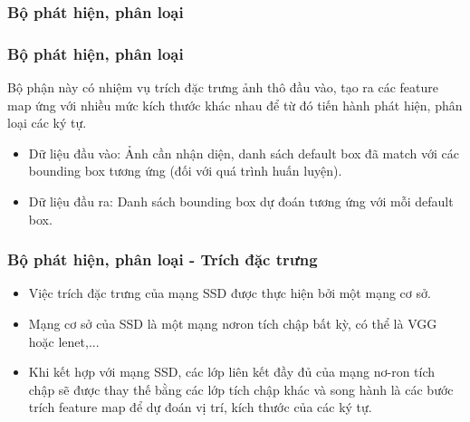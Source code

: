 \documentclass{beamer}
\begin{document}
	\subsubsection{Bộ phát hiện, phân loại}
	\begin{frame}
		\frametitle{Bộ phát hiện, phân loại}
		Bộ phận này có nhiệm vụ trích đặc trưng ảnh thô đầu vào, tạo ra các feature map ứng với nhiều mức kích thước khác nhau để từ đó tiến hành phát hiện, phân loại các ký tự.
		
		\begin{itemize}
			\item Dữ liệu đầu vào: Ảnh cần nhận diện, danh sách default box đã match với các bounding box tương ứng (đối với quá trình huấn luyện).
			\item Dữ liệu đầu ra: Danh sách bounding box dự đoán tương ứng với mỗi default box.
		\end{itemize}
		
		
		
		
		
	\end{frame}
	
	\begin{frame}
		\frametitle{Bộ phát hiện, phân loại - Trích đặc trưng}
		\begin{itemize}
			\item Việc trích đặc trưng của mạng SSD được thực hiện bởi một mạng cơ sở.
			\item 	Mạng cơ sở của SSD là một mạng nơron tích chập bất kỳ, có thể là VGG hoặc lenet,... 
			\item Khi kết hợp với mạng SSD, các lớp liên kết đầy đủ của mạng nơ-ron tích chập sẽ được thay thế bằng các lớp tích chập khác và song hành là các bước trích feature map để dự đoán vị trí, kích thước của các ký tự.
		\end{itemize}
		
		
		
		
	\end{frame}
	
\end{document}

